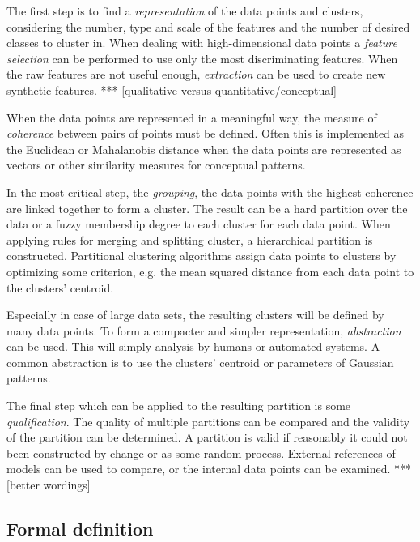 The first step is to find a \emph{representation} of the data points and 
clusters, considering the number, type and scale of the features and the 
number of desired classes to cluster in. When dealing with high-dimensional 
data points a \emph{feature selection} can be performed to use only the most 
discriminating features. When the raw features are not useful enough, 
\emph{extraction} can be used to create new synthetic features. *** 
[qualitative versus quantitative/conceptual]

When the data points are represented in a meaningful way, the measure of 
\emph{coherence} between pairs of points must be defined. Often this is 
implemented as the Euclidean 
or Mahalanobis distance when the data points are represented as vectors or 
other similarity measures for conceptual patterns.

In the most critical step, the \emph{grouping}, the data points with the 
highest coherence are linked together to form a cluster. The result can be a 
hard partition over the data or a fuzzy membership degree to each cluster for 
each data point. When applying rules for merging and splitting cluster, a 
hierarchical partition is constructed. Partitional clustering algorithms 
assign data points to clusters by optimizing some criterion, e.g. the mean 
squared distance from each data point to the clusters' centroid.

Especially in case of large data sets, the resulting clusters will be defined 
by many data points. To form a compacter and simpler representation, 
\emph{abstraction} can be used. This will simply analysis by humans or 
automated systems. A common abstraction is to use the clusters' centroid 
\cite{diday1976clustering} or parameters of Gaussian patterns.

The final step which can be applied to the resulting partition is some 
\emph{qualification}. The quality of multiple partitions can be compared and 
the validity of the partition can be determined. A partition is valid if 
reasonably it could not been constructed by change or as some random process. 
External references of models can be used to compare, or the internal data 
points can be examined. *** [better wordings]



\subsection{Formal definition}





